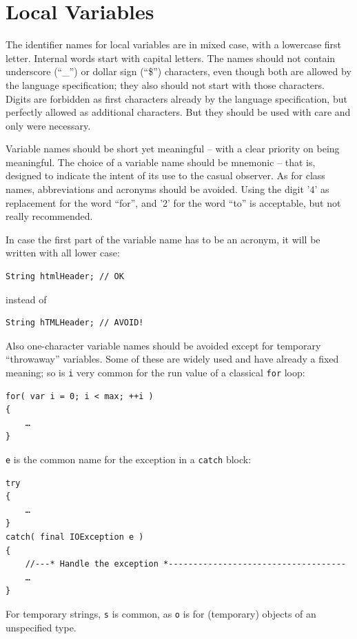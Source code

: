 \documentclass[11pt,a4paper, titlepage, parskip=half, headsepline, footsepline, cleardoublepage=current, headheight=1cm]{scrbook}
\begin{document}
\section{Local Variables}\label{sec:NamesForLocalVariables}
The identifier names for local variables are in mixed case, with a lowercase first letter. Internal words start with capital letters. The names should not contain underscore (“\_”) or dollar sign (“\$”) characters, even though both are allowed by the language specification; they also should not start with those characters. Digits are forbidden as first characters already by the language specification, but perfectly allowed as additional characters. But they should be used with care and only were necessary.

Variable names should be short yet meaningful – with a clear priority on being meaningful. The choice of a variable name should be mnemonic – that is, designed to indicate the intent of its use to the casual observer. As for class names, abbreviations and acronyms should be avoided. Using the digit '4' as replacement for the word “for”, and '2' for the word “to” is acceptable, but not really recommended.

In case the first part of the variable name has to be an acronym, it will be written with all lower case:
\begin{lstlisting}
String htmlHeader; // OK
\end{lstlisting}
instead of
\begin{lstlisting}
String hTMLHeader; // AVOID!
\end{lstlisting}

Also one-character variable names should be avoided except for temporary “throwaway” variables. Some of these are widely used and have already a fixed meaning; so is \lstinline|i| very common for the run value of a classical \lstinline|for| loop:
\begin{lstlisting}
for( var i = 0; i < max; ++i )
{
    …
}
\end{lstlisting}

\lstinline|e| is the common name for the exception in a \lstinline|catch| block:
\begin{lstlisting}
try
{
    …
}
catch( final IOException e )
{
    //---* Handle the exception *------------------------------------
    …
}    
\end{lstlisting}

For temporary strings, \lstinline|s| is common, as \lstinline|o| is for (temporary) objects of an unspecified type.
\end{document}
